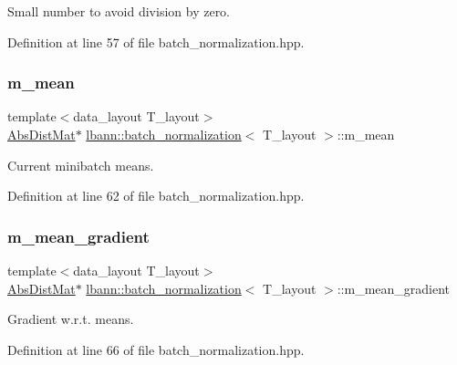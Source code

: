 Small number to avoid division by zero. 

Definition at line 57 of file batch\+\_\+normalization.\+hpp.

\mbox{\label{classlbann_1_1batch__normalization_a7c0db2315a4c5bb662da7a740ae76e24}} 
\subsubsection{\texorpdfstring{m\+\_\+mean}{m\_mean}}
{\footnotesize\ttfamily template$<$data\+\_\+layout T\+\_\+layout$>$ \\
\hyperlink{base_8hpp_a9a697a504ae84010e7439ffec862b470}{Abs\+Dist\+Mat}$\ast$ \hyperlink{classlbann_1_1batch__normalization}{lbann\+::batch\+\_\+normalization}$<$ T\+\_\+layout $>$\+::m\+\_\+mean\hspace{0.3cm}{\ttfamily [private]}}

Current minibatch means. 

Definition at line 62 of file batch\+\_\+normalization.\+hpp.

\mbox{\label{classlbann_1_1batch__normalization_aa4677c2f7d5ea27c53bf0f61f280a2a3}} 
\subsubsection{\texorpdfstring{m\+\_\+mean\+\_\+gradient}{m\_mean\_gradient}}
{\footnotesize\ttfamily template$<$data\+\_\+layout T\+\_\+layout$>$ \\
\hyperlink{base_8hpp_a9a697a504ae84010e7439ffec862b470}{Abs\+Dist\+Mat}$\ast$ \hyperlink{classlbann_1_1batch__normalization}{lbann\+::batch\+\_\+normalization}$<$ T\+\_\+layout $>$\+::m\+\_\+mean\+\_\+gradient\hspace{0.3cm}{\ttfamily [private]}}

Gradient w.\+r.\+t. means. 

Definition at line 66 of file batch\+\_\+normalization.\+hpp.

